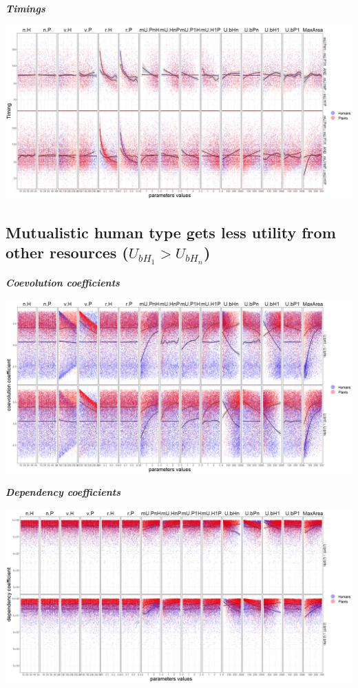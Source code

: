 \documentclass[
]{book}
\begin{document}
\textbf{\emph{Timings}}

\includegraphics[width=1\linewidth]{plots/5_multiplePar-timing-bothImprove-ggplot}

\newpage

\hypertarget{mutualistic-human-type-gets-less-utility-from-other-resources-u_bh_1u_bh_n}{%
\subsection{\texorpdfstring{Mutualistic human type gets less utility from other resources (\(U_{bH_{1}}>U_{bH_{n}}\))}{Mutualistic human type gets less utility from other resources (U\_\{bH\_\{1\}\}\textgreater U\_\{bH\_\{n\}\})}}\label{mutualistic-human-type-gets-less-utility-from-other-resources-u_bh_1u_bh_n}}


\textbf{\emph{Coevolution coefficients}}

\includegraphics[width=1\linewidth]{plots/5_multiplePar-coevo-humanLessBase-ggplot}

\textbf{\emph{Dependency coefficients}}

\includegraphics[width=1\linewidth]{plots/5_multiplePar-depend-humanLessBase-ggplot}
\end{document}
